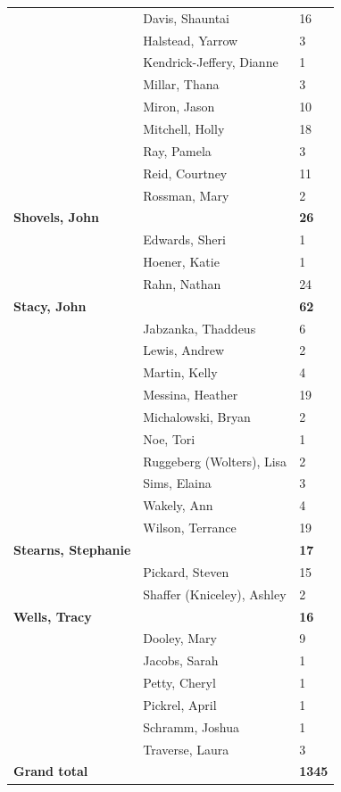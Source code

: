 \documentclass{article}\usepackage[]{graphicx}\usepackage[]{color}
\begin{document}
{\begin{longtable} { >{\raggedright}p{}|p{}p{}}
   & Davis, Shauntai & 16 \\ 
   & Halstead, Yarrow & 3 \\ 
   \rowcolor[gray]{0.90} & Kendrick-Jeffery, Dianne & 1 \\ 
   \rowcolor[gray]{0.90} & Millar, Thana & 3 \\ 
   \rowcolor[gray]{0.90} & Miron, Jason & 10 \\ 
   & Mitchell, Holly & 18 \\ 
   & Ray, Pamela & 3 \\ 
   & Reid, Courtney & 11 \\ 
   \rowcolor[gray]{0.90} & Rossman, Mary & 2 \\ 
   \rowcolor[gray]{0.90}\textbf{Shovels, John} &  & \hspace{2cm}\textbf{26} \\ 
   \rowcolor[gray]{0.90} & Edwards, Sheri & 1 \\ 
   & Hoener, Katie & 1 \\ 
   & Rahn, Nathan & 24 \\ 
  \textbf{Stacy, John} &  & \hspace{2cm}\textbf{62} \\ 
   \rowcolor[gray]{0.90} & Jabzanka, Thaddeus & 6 \\ 
   \rowcolor[gray]{0.90} & Lewis, Andrew & 2 \\ 
   \rowcolor[gray]{0.90} & Martin, Kelly & 4 \\ 
   & Messina, Heather & 19 \\ 
   & Michalowski, Bryan & 2 \\ 
   & Noe, Tori & 1 \\ 
   \rowcolor[gray]{0.90} & Ruggeberg (Wolters), Lisa & 2 \\ 
   \rowcolor[gray]{0.90} & Sims, Elaina & 3 \\ 
   \rowcolor[gray]{0.90} & Wakely, Ann & 4 \\ 
   & Wilson, Terrance & 19 \\ 
  \textbf{Stearns, Stephanie} &  & \hspace{2cm}\textbf{17} \\ 
   & Pickard, Steven & 15 \\ 
   \rowcolor[gray]{0.90} & Shaffer (Kniceley), Ashley & 2 \\ 
   \rowcolor[gray]{0.90}\textbf{Wells, Tracy} &  & \hspace{2cm}\textbf{16} \\ 
   \rowcolor[gray]{0.90} & Dooley, Mary & 9 \\ 
   & Jacobs, Sarah & 1 \\ 
   & Petty, Cheryl & 1 \\ 
   & Pickrel, April & 1 \\ 
   \rowcolor[gray]{0.90} & Schramm, Joshua & 1 \\ 
   \rowcolor[gray]{0.90} & Traverse, Laura & 3 \\ 
   \rowcolor[gray]{0.90}\textbf{Grand total} &  & \textbf{1345} \\ 
   \end{longtable}

}
\end{document}
